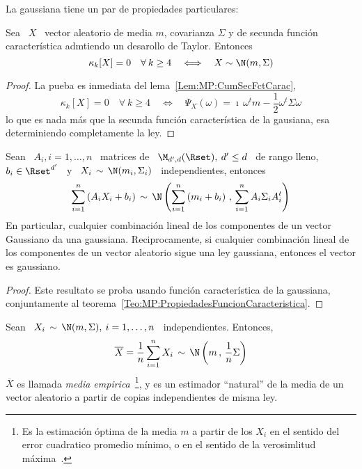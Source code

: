 La gaussiana tiene un par de propiedades particulares:
%
\begin{lema}
%
  Sea \  $X$ \ vector aleatorio de  media $m$, covarianza $\Sigma$  y de secunda
  funci\'on caracter\'istica admtiendo un desarollo de Taylor. Entonces
  \[
  \kappa_k[X] =  0 \quad \forall \: k  \ge 4 \quad \Longleftrightarrow  \quad X \sim
  \N(m,\Sigma)
  \]
\end{lema}
%
\begin{proof}
  La pueba es inmediata del lema~\ref{Lem:MP:CumSecFctCarac},
  \[
  \kappa_k[X]  =  0  \quad  \forall  \:  k \ge  4  \quad  \Longleftrightarrow  \quad
  \Psi_X(\omega) = \imath \, \omega^t m - \frac12 \omega^t \Sigma \omega
  \]
  lo que es nada m\'as que la secunda funci\'on caracter\'istica de la gausiana,
  esa determiniendo completamente la ley.
\end{proof}
%
\begin{teorema}[Stabilidad]
\label{Teo:MP:StabilidadGaussiana}
%
  Sean \ $A_i , i = 1,\ldots,n$  \ matrices de \ $\M_{d',d}(\Rset), \: d' \le d$
  \ de rango lleno, $b_i \in \Rset^{d'}$ \ y \ $X_i \, \sim \, \N(m_i,\Sigma_i)$
  \ independientes, entonces
  \[
  \sum_{i=1}^n \left(  A_i X_i  + b_i \right)  \, \sim \,  \N\left( \sum_{i=1}^n
    \left( m_i + b_i \right) \, , \, \sum_{i=1}^n A_i \Sigma_i A_i^t \right)
  \]
  En particular, cualquier combinaci\'on lineal  de los componentes de un vector
  Gaussiano da una gaussiana.  Reciprocamente, si cualquier combinaci\'on lineal
  de los componentes de un vector aleatorio sigue una ley gaussiana, entonces el
  vector es gaussiano.
\end{teorema}
%
\begin{proof}
  Este  resultato se proba  usando funci\'on  caracter\'istica de  la gaussiana,
  conjuntamente al teorema~\ref{Teo:MP:PropiedadesFuncionCaracteristica}.
\end{proof}
%
\begin{corolario}\label{Cor:MP:MediaEmpiricaGauss}
%
  Sean \ $X_i \, \sim \, \N(m,\Sigma), \: i = 1, \ldots , n$ \ independientes. Entonces,
  \[
  \overline{X} =  \frac{1}{n} \sum_{i=1}^n  X_i \,  \sim \, \N\left(  m \,  , \,
    \frac{1}{n} \Sigma \right)
  \]
  $\overline{X}$  es llamada {\em  media empirica}~\footnote{Es  la estimaci\'on
    \'optima de  la media  $m$ a  partir de los  $X_i$ en  el sentido  del error
    cuadratico  promedio   m\'inimo,  o  en   el  sentido  de   la  verosimlitud
    m\'axima~\cite{Kay93, Rob07}.}, y es un estimador ``natural'' de la media de
  un vector aleatorio a partir de copias independientes de misma ley.
\end{corolario}
